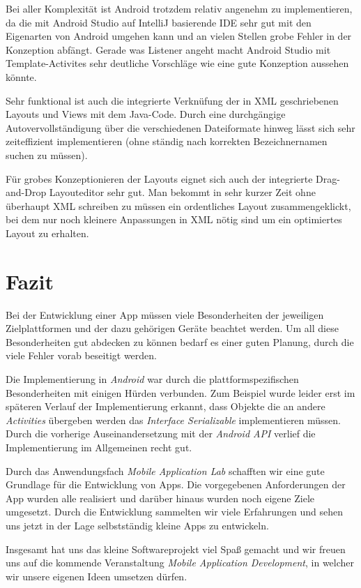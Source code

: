 Bei aller Komplexität ist Android trotzdem relativ angenehm zu implementieren, da die mit Android Studio auf IntelliJ basierende IDE sehr gut mit den Eigenarten von Android umgehen kann und an vielen Stellen grobe Fehler in der Konzeption abfängt. Gerade was Listener angeht macht Android Studio mit  Template-Activites sehr deutliche Vorschläge wie eine gute Konzeption aussehen könnte. 

Sehr funktional ist auch die integrierte Verknüfung der in XML geschriebenen Layouts und Views mit dem Java-Code. Durch eine durchgängige Autovervollständigung über die verschiedenen Dateiformate hinweg lässt sich sehr zeiteffizient implementieren (ohne ständig nach korrekten Bezeichnernamen suchen zu müssen).

Für grobes Konzeptionieren der Layouts eignet sich auch der integrierte Drag-and-Drop Layouteditor sehr gut. Man bekommt in sehr kurzer Zeit ohne überhaupt XML schreiben zu müssen ein ordentliches Layout zusammengeklickt, bei dem nur noch kleinere Anpassungen in XML nötig sind um ein optimiertes Layout zu erhalten.

\section{Fazit}
\label{cha:fazit}

Bei der Entwicklung einer App müssen viele Besonderheiten der jeweiligen Zielplattformen und der dazu gehörigen Geräte beachtet werden. Um all diese Besonderheiten gut abdecken zu können bedarf es einer guten Planung, durch die viele Fehler vorab beseitigt werden.

Die Implementierung in \textit{Android} war durch die plattformspezifischen Besonderheiten mit einigen Hürden verbunden. Zum Beispiel wurde leider erst im späteren Verlauf der Implementierung erkannt, dass Objekte die an andere \textit{Activities} übergeben werden das \textit{Interface Serializable} implementieren müssen. Durch die vorherige Auseinandersetzung mit der \textit{Android API} verlief die Implementierung im Allgemeinen recht gut.

Durch das Anwendungsfach \textit{Mobile Application Lab} schafften wir eine gute Grundlage für die Entwicklung von Apps. Die vorgegebenen Anforderungen der App wurden alle realisiert und darüber hinaus wurden noch eigene Ziele umgesetzt. Durch die Entwicklung sammelten wir viele Erfahrungen und sehen uns jetzt in der Lage selbstständig kleine Apps zu entwickeln.

Insgesamt hat uns das kleine Softwareprojekt viel Spaß gemacht und wir freuen uns auf die kommende Veranstaltung \textit{Mobile Application Development}, in welcher wir unsere eigenen Ideen umsetzen dürfen.


